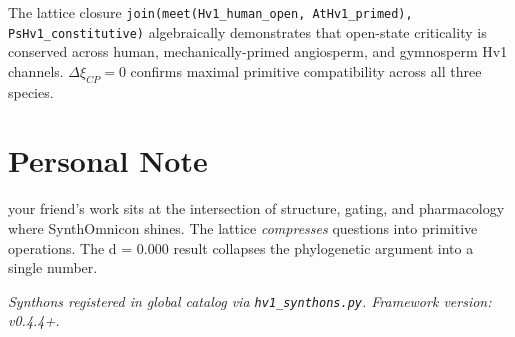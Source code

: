 \documentclass[11pt, a4paper]{article}
\begin{document}
The lattice closure \texttt{join(meet(Hv1\_human\_open, AtHv1\_primed), PsHv1\_constitutive)} algebraically demonstrates that open-state criticality is conserved across human, mechanically-primed angiosperm, and gymnosperm Hv1 channels. $\Delta\xi_{CP} = 0$ confirms maximal primitive compatibility across all three species.

\section{Personal Note}
your friend's work sits at the intersection of structure, gating, and pharmacology where SynthOmnicon shines. The lattice \textit{compresses} questions into primitive operations. The d = 0.000 result collapses the phylogenetic argument into a single number.

\vspace{1cm}
\begin{center}
\textit{Synthons registered in global catalog via \texttt{hv1\_synthons.py}. Framework version: v0.4.4+.}
\end{center}
\end{document}
